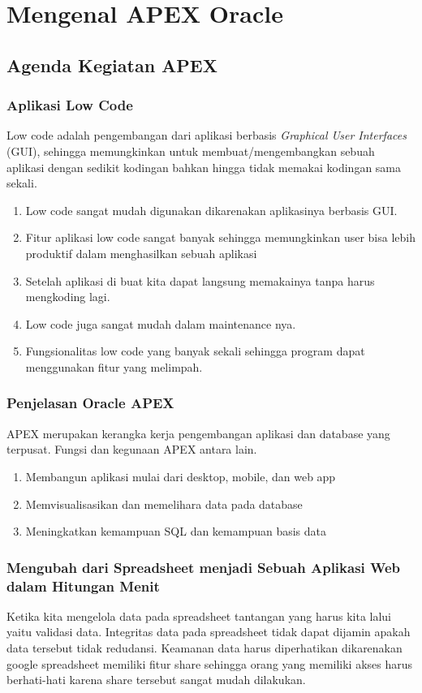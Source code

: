 \chapter{Mengenal APEX Oracle}

\section{Agenda Kegiatan APEX}

\subsection{Aplikasi Low Code}
Low code adalah pengembangan dari aplikasi berbasis \textit{Graphical User Interfaces} (GUI), sehingga memungkinkan untuk membuat/mengembangkan sebuah aplikasi dengan sedikit kodingan bahkan hingga tidak memakai kodingan sama sekali.

\begin{enumerate}
\item Low code sangat mudah digunakan dikarenakan aplikasinya berbasis GUI.
\item Fitur aplikasi low code sangat banyak sehingga memungkinkan user bisa lebih produktif dalam menghasilkan sebuah aplikasi
\item Setelah aplikasi di buat kita dapat langsung memakainya tanpa harus mengkoding lagi.
\item Low code juga sangat mudah dalam maintenance nya.
\item Fungsionalitas low code yang banyak sekali sehingga program dapat menggunakan fitur yang melimpah.
\end{enumerate}

\subsection{Penjelasan Oracle APEX}
APEX merupakan kerangka kerja pengembangan aplikasi dan database yang terpusat. Fungsi dan kegunaan APEX antara lain.
\begin{enumerate}
\item Membangun aplikasi mulai dari desktop, mobile, dan web app
\item Memvisualisasikan dan memelihara data pada database
\item Meningkatkan kemampuan SQL dan kemampuan basis data
\end{enumerate}

\subsection{Mengubah dari Spreadsheet menjadi Sebuah Aplikasi Web dalam Hitungan Menit}
Ketika kita mengelola data pada spreadsheet tantangan yang harus kita lalui yaitu validasi data. Integritas data pada spreadsheet tidak dapat dijamin apakah data tersebut tidak redudansi. Keamanan data harus diperhatikan dikarenakan google spreadsheet memiliki fitur share sehingga orang yang memiliki akses harus berhati-hati karena share tersebut sangat mudah dilakukan.

